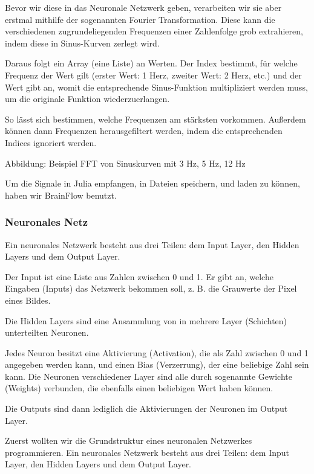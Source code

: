 \documentclass{scrartcl}
\begin{document}
	Bevor wir diese in das Neuronale Netzwerk geben, verarbeiten wir sie aber erstmal mithilfe der sogenannten Fourier Transformation. Diese kann die verschiedenen zugrundeliegenden Frequenzen einer Zahlenfolge grob extrahieren, indem diese in Sinus-Kurven zerlegt wird.

	Daraus folgt ein Array (eine Liste) an Werten. Der Index bestimmt, für welche Frequenz der Wert gilt (erster Wert: 1 Herz, zweiter Wert: 2 Herz, etc.) und der Wert gibt an, womit die entsprechende Sinus-Funktion multipliziert werden muss, um die originale Funktion wiederzuerlangen. \cite{3b1b:fft}

	So lässt sich bestimmen, welche Frequenzen am stärksten vorkommen. Außerdem können dann Frequenzen herausgefiltert werden, indem die entsprechenden Indices ignoriert werden.

	Abbildung: Beispiel FFT von Sinuskurven mit 3 Hz, 5 Hz, 12 Hz

	Um die Signale in Julia empfangen, in Dateien speichern, und laden zu können, haben wir BrainFlow benutzt.


	\subsubsection{Neuronales Netz}

	Ein neuronales Netzwerk besteht aus drei Teilen: dem Input Layer, den Hidden Layers und dem Output Layer. 

	Der Input ist eine Liste aus Zahlen zwischen 0 und 1. Er gibt an, welche Eingaben (Inputs) das Netzwerk bekommen soll, z. B. die Grauwerte der Pixel eines Bildes.
	
	Die Hidden Layers sind eine Ansammlung von in mehrere Layer (Schichten) unterteilten Neuronen. 
	
	Jedes Neuron besitzt eine Aktivierung (Activation), die als Zahl zwischen 0 und 1 angegeben werden kann, und einen Bias (Verzerrung), der eine beliebige Zahl sein kann. Die Neuronen verschiedener Layer sind alle durch sogenannte Gewichte (Weights) verbunden, die ebenfalls einen beliebigen Wert haben können. 

	Die Outputs sind dann lediglich die Aktivierungen der Neuronen im Output Layer.
	

	Zuerst wollten wir die Grundstruktur eines neuronalen Netzwerkes programmieren. Ein neuronales Netzwerk besteht aus drei Teilen: dem Input Layer, den Hidden Layers und dem Output Layer.
\end{document}
